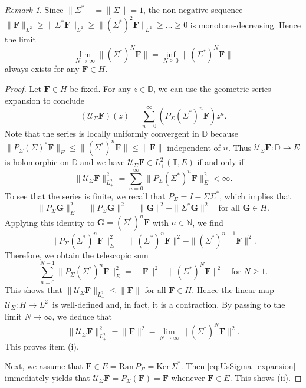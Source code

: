 \documentclass[10pt,reqno,a4paper]{amsart}
\theoremstyle{definition}
\theoremstyle{remark}
\theoremstyle{remark}
\newtheorem*{remark*}{Remark}
\numberwithin{equation}{section}
\newcommand{\N}{\mathbb{N}}
\newcommand{\T}{\mathbb{T}}
\newcommand{\D}{\mathbb{D}}
\newcommand{\ran}{\mathrm{Ran}}
\renewcommand{\ker}{\mathrm{Ker}}
\newcommand{\be}{\begin{equation}}
\newcommand{\ee}{\end{equation}}
\newcommand{\Fb}{\mathbf{F}}
\newcommand{\Gb}{\mathbf{G}}
\newcommand{\id}{I}
\newcommand{\Us}{\mathscr{U}}
\begin{document}
\begin{remark*}
Since $\| \Sigma^* \| = \| \Sigma \| = 1$, the non-negative sequence $\| \Fb \|_{L^2} \geq \| \Sigma^* \Fb \|_{L^2} \geq \| (\Sigma^*)^2 \Fb \|_{L^2} \geq \ldots \geq 0$ is monotone-decreasing. Hence the limit 
$$
\lim_{N \to \infty} \| (\Sigma^*)^N \Fb \| = \inf_{N \geq 0} \| (\Sigma^*)^N \Fb \|
$$ 
always exists for any $\Fb \in H$.
\end{remark*}



\begin{proof}
Let $\Fb \in H$ be fixed.  For any $z \in \D$, we can use the geometric series expansion to conclude
\be \label{eq:UsSigma_expansion}
(\Us_\Sigma \Fb)(z) = \sum_{n=0}^\infty (P_{\Sigma} (\Sigma^*)^n \Fb) z^n.
\ee
Note that the series is locally uniformly convergent in $\D$ because $\| P_\Sigma (\Sigma)^* \Fb \|_E \leq \| (\Sigma^*)^n \Fb \| \leq \| \Fb \|$ independent of $n$. Thus $\Us_\Sigma \Fb : \D \to E$ is holomorphic on $\D$ and we have $\Us_\Sigma \Fb \in L^2_+(\T,E)$ if and only if
$$
\| \Us_\Sigma \Fb \|_{L^2_+}^2 = \sum_{n=0}^\infty \| P_\Sigma (\Sigma^*)^n \Fb \|_E^2 < \infty.
$$
To see that the series is finite, we recall that $P_\Sigma = \id - \Sigma \Sigma^*$, which implies that
$$
\| P_\Sigma \Gb \|_E^2 = \| P_\Sigma \Gb \|^2 = \| \Gb \|^2 - \| \Sigma^* \Gb \|^2 \quad \mbox{for all $\Gb \in H$}.
$$
Applying this identity to $\Gb = (\Sigma^*)^n \Fb$ with $n \in \N$, we find
\be \label{eq:PSigma_1}
\| P_\Sigma (\Sigma^*)^n \Fb \|_E^2 = \| (\Sigma^*)^n \Fb \|^2  - \| (\Sigma^*)^{n+1} \Fb \|^2. 
\ee
Therefore, we obtain the telescopic sum
$$
\sum_{n=0}^{N-1} \| P_\Sigma (\Sigma^*)^n \Fb \|_E^2 = \| \Fb \|^2 - \|(\Sigma^*)^N \Fb \|^2 \quad \mbox{for $N \geq 1$}.
$$
This shows that $\| \Us_\Sigma \Fb \|_{L^2_+} \leq \| \Fb \|$ for all $\Fb \in H$. Hence the linear map $\Us_\Sigma : H \to L^2_+$ is well-defined and, in fact, it is a contraction. By passing to the limit $N \to \infty$, we deduce that
$$
\| \Us_\Sigma \Fb \|_{L^2_+}^2 = \| \Fb \|^2 - \lim_{N \to \infty} \| (\Sigma^*)^N \Fb \|^2.
$$ 
This proves item (i).

Next, we assume that $\Fb \in E = \ran \, P_\Sigma = \ker \, \Sigma^*$. Then \eqref{eq:UsSigma_expansion} immediately yields that $\Us_\Sigma \Fb = P_\Sigma(\Fb) = \Fb$ whenever $\Fb \in E$. This shows (ii). 


\end{proof}
\end{document}
